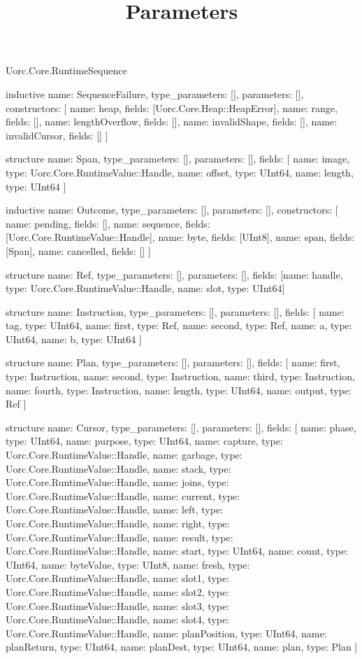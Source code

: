 \begin{lexlean}{Uorc.Core.RuntimeSequence}
\title{Parameters}
\begin{semanticmodule}
inductive{
  name: SequenceFailure,
  type_parameters: [],
  parameters: [],
  constructors: [
    {name: heap, fields: [Uorc.Core.Heap::HeapError]},
    {name: range, fields: []},
    {name: lengthOverflow, fields: []},
    {name: invalidShape, fields: []},
    {name: invalidCursor, fields: []}
  ]
}

structure{
  name: Span,
  type_parameters: [],
  parameters: [],
  fields: [
    {name: image, type: Uorc.Core.RuntimeValue::Handle},
    {name: offset, type: UInt64},
    {name: length, type: UInt64}
  ]
}

inductive{
  name: Outcome,
  type_parameters: [],
  parameters: [],
  constructors: [
    {name: pending, fields: []},
    {name: sequence, fields: [Uorc.Core.RuntimeValue::Handle]},
    {name: byte, fields: [UInt8]},
    {name: span, fields: [Span]},
    {name: cancelled, fields: []}
  ]
}

structure{
  name: Ref,
  type_parameters: [],
  parameters: [],
  fields: [{name: handle, type: Uorc.Core.RuntimeValue::Handle}, {name: slot, type: UInt64}]
}

structure{
  name: Instruction,
  type_parameters: [],
  parameters: [],
  fields: [
    {name: tag, type: UInt64},
    {name: first, type: Ref},
    {name: second, type: Ref},
    {name: a, type: UInt64},
    {name: b, type: UInt64}
  ]
}

structure{
  name: Plan,
  type_parameters: [],
  parameters: [],
  fields: [
    {name: first, type: Instruction},
    {name: second, type: Instruction},
    {name: third, type: Instruction},
    {name: fourth, type: Instruction},
    {name: length, type: UInt64},
    {name: output, type: Ref}
  ]
}

structure{
  name: Cursor,
  type_parameters: [],
  parameters: [],
  fields: [
    {name: phase, type: UInt64},
    {name: purpose, type: UInt64},
    {name: capture, type: Uorc.Core.RuntimeValue::Handle},
    {name: garbage, type: Uorc.Core.RuntimeValue::Handle},
    {name: stack, type: Uorc.Core.RuntimeValue::Handle},
    {name: joins, type: Uorc.Core.RuntimeValue::Handle},
    {name: current, type: Uorc.Core.RuntimeValue::Handle},
    {name: left, type: Uorc.Core.RuntimeValue::Handle},
    {name: right, type: Uorc.Core.RuntimeValue::Handle},
    {name: result, type: Uorc.Core.RuntimeValue::Handle},
    {name: start, type: UInt64},
    {name: count, type: UInt64},
    {name: byteValue, type: UInt8},
    {name: fresh, type: Uorc.Core.RuntimeValue::Handle},
    {name: slot1, type: Uorc.Core.RuntimeValue::Handle},
    {name: slot2, type: Uorc.Core.RuntimeValue::Handle},
    {name: slot3, type: Uorc.Core.RuntimeValue::Handle},
    {name: slot4, type: Uorc.Core.RuntimeValue::Handle},
    {name: planPosition, type: UInt64},
    {name: planReturn, type: UInt64},
    {name: planDest, type: UInt64},
    {name: plan, type: Plan}
  ]
}


\end{semanticmodule}
\end{lexlean}
